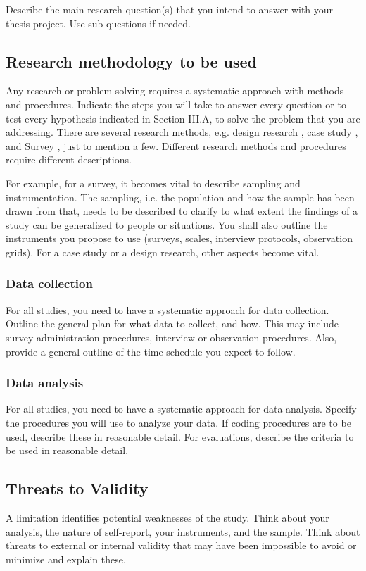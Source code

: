 \documentclass[conference]{IEEEtran}
\begin{document}
Describe the main research question(s) that you intend to answer with your thesis project. Use sub-questions if needed.

\subsection{Research methodology to be used}
Any research or problem solving requires a systematic approach with methods and procedures. Indicate the steps you will take to answer every question or to test every hypothesis indicated in Section III.A, to solve the problem that you are addressing. There are several research methods, e.g. design research \cite{b3}, case study \cite{b5}, and Survey \cite{b2, b4}, just to mention a few. Different research methods and procedures require different descriptions.

For example, for a survey, it becomes vital to describe sampling and instrumentation. The sampling, i.e. the population and how the sample has been drawn from that, needs to be described to clarify to what extent the findings of a study can be generalized to people or situations. You shall also outline the instruments you propose to use (surveys, scales, interview protocols, observation grids). For a case study or a design research, other aspects become vital.

\subsubsection{Data collection}
For all studies, you need to have a systematic approach for data collection. Outline the general plan for what data to collect, and how. This may include survey administration procedures, interview or observation procedures. Also, provide a general outline of the time schedule you expect to follow.

\subsubsection{Data analysis}
For all studies, you need to have a systematic approach for data analysis. Specify the procedures you will use to analyze your data. If coding procedures are to be used, describe these in reasonable detail. For evaluations, describe the criteria to be used in reasonable detail.

\subsection{Threats to Validity}
A limitation identifies potential weaknesses of the study. Think about your analysis, the nature of self-report, your instruments, and the sample. Think about threats to external or internal validity that may have been impossible to avoid or minimize and explain these.
\end{document}
